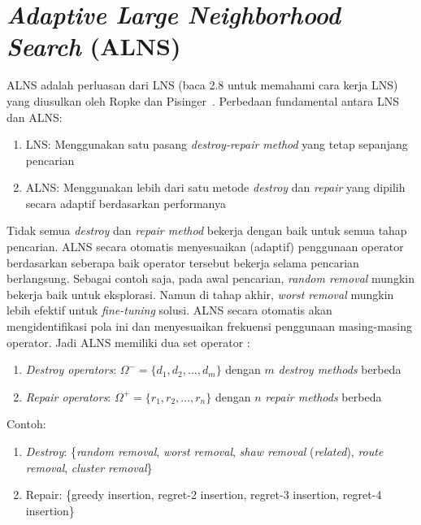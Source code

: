 \documentclass{file/TA-ITS}
\theoremstyle{definition}
\theoremstyle{definition}
\theoremstyle{plain}
\begin{document}
    

\section{\textit{Adaptive Large Neighborhood Search }(ALNS)}
ALNS adalah perluasan dari LNS (baca 2.8 untuk memahami cara kerja LNS) yang diusulkan oleh Ropke dan Pisinger~\cite{ropke2006alns}. Perbedaan fundamental antara LNS dan ALNS:

\begin{enumerate}
    \item LNS: Menggunakan satu pasang \textit{destroy-repair method} yang tetap sepanjang pencarian
    \item ALNS: Menggunakan lebih dari satu metode \textit{destroy} dan \textit{repair} yang dipilih secara adaptif berdasarkan performanya
\end{enumerate}
Tidak semua \textit{destroy} dan \textit{repair method} bekerja dengan baik untuk semua tahap pencarian. ALNS secara otomatis menyesuaikan (adaptif) penggunaan operator berdasarkan seberapa baik operator tersebut bekerja selama pencarian berlangsung. Sebagai contoh saja, pada awal pencarian, \textit{random removal} mungkin bekerja baik untuk eksplorasi. Namun di tahap akhir, \textit{worst removal} mungkin lebih efektif untuk \textit{fine-tuning} solusi. ALNS secara otomatis akan mengidentifikasi pola ini dan menyesuaikan frekuensi penggunaan masing-masing operator. Jadi ALNS memiliki dua set operator \cite{pisinger2018lns}:
\begin{enumerate}
    \item \textit{Destroy operators}: $\Omega^- = \{d_1, d_2, \ldots, d_m\}$ dengan $m$ \textit{destroy methods} berbeda
    \item \textit{Repair operators}: $\Omega^+ = \{r_1, r_2, \ldots, r_n\}$ dengan $n$ \textit{repair methods} berbeda
\end{enumerate}

Contoh:
\begin{enumerate}
    \item \textit{Destroy}: \{\textit{random removal}, \textit{worst removal}, \textit{shaw removal} (\textit{related}), \textit{route removal}, \textit{cluster removal}\}
    \item Repair: \{greedy insertion, regret-2 insertion, regret-3 insertion, regret-4 insertion\}
\end{enumerate}
\end{document}
